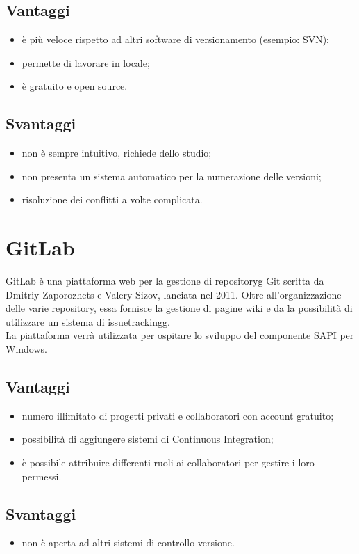 \subsection*{Vantaggi}
\begin{itemize}
	\item è più veloce rispetto ad altri software di versionamento (esempio: SVN);
	\item permette di lavorare in locale;
	\item è gratuito e open source.
\end{itemize}
\subsection*{Svantaggi}
\begin{itemize}
	\item non è sempre intuitivo, richiede dello studio;
	\item non presenta un sistema automatico per la numerazione delle versioni;
	\item risoluzione dei conflitti a volte complicata.
\end{itemize}
\section{GitLab}
GitLab è una piattaforma web per la gestione di \gls{repositoryg} Git scritta da Dmitriy Zaporozhets e Valery Sizov, lanciata nel 2011. Oltre all'organizzazione delle varie repository, essa fornisce la gestione di pagine wiki e da la possibilità di utilizzare un sistema di \gls{issuetrackingg}.\\
La piattaforma verrà utilizzata per ospitare lo sviluppo del componente SAPI per Windows.
\subsection*{Vantaggi}
\begin{itemize}
	\item numero illimitato di progetti privati e collaboratori con account gratuito;
	\item possibilità di aggiungere sistemi di Continuous Integration;
	\item è possibile attribuire differenti ruoli ai collaboratori per gestire i loro permessi.
\end{itemize}
\subsection*{Svantaggi}
\begin{itemize}
	\item non è aperta ad altri sistemi di controllo versione.
\end{itemize}
